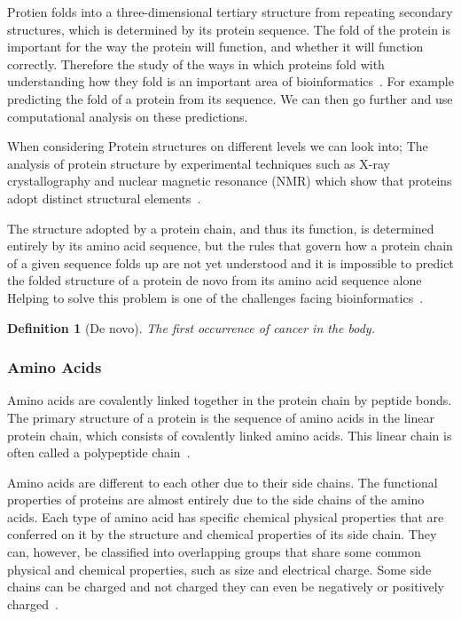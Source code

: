 \documentclass{report}
\newtheorem{definition}{Definition}[section]
\begin{document}
Protien folds into a three-dimensional tertiary structure from repeating secondary structures, which is determined by its protein sequence. The fold of the protein is important for the way the protein will function, and whether it will function correctly. Therefore the study of the ways in which proteins fold with understanding how they fold is an important area of bioinformatics~\cite{zvelebil_understanding_2008}. For example predicting the fold of a protein from its sequence. We can then go further and use computational analysis on these predictions.

When considering Protein structures on different levels we can look into; The analysis of protein structure by experimental techniques such as X-ray crystallography and nuclear magnetic resonance (NMR) which show that proteins adopt distinct structural elements~\cite{zvelebil_understanding_2008}. 

The structure adopted by a protein chain, and thus its function, is determined entirely by its amino acid sequence, but the rules that govern how a protein chain of a given sequence folds up are not yet understood and it is impossible to predict the folded structure of a protein de novo from its amino acid sequence alone Helping to solve this problem is one of the challenges facing bioinformatics~\cite{zvelebil_understanding_2008}.

\begin{definition}[De novo]
    The first occurrence of cancer in the body.
\end{definition}

\subsubsection{Amino Acids}

Amino acids are covalently linked together in the protein chain by peptide bonds. The primary structure of a protein is the sequence of amino acids in the linear protein chain, which consists of covalently linked amino acids. This linear chain is often called a polypeptide chain~\cite{zvelebil_understanding_2008}.

Amino acids are different to each other due to their side chains. The functional properties of proteins are almost entirely due to the side chains of the amino acids. Each type of amino acid has specific chemical physical properties that are conferred on it by the structure and chemical properties of its side chain. They can, however, be classified into overlapping groups that share some common physical and chemical properties, such as size and electrical charge. Some side chains can be charged and not charged they can even be negatively or positively charged~\cite{zvelebil_understanding_2008}.
\end{document}
